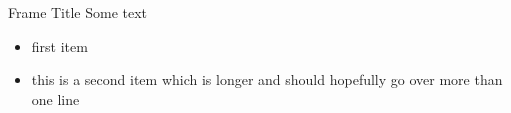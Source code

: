 \documentclass{beamer}
\begin{document}
\begin{frame}{Frame Title}
Some text
\addtolength{\leftmargini}{\labelsep}
\begin{itemize}
    \item first item
    \item this is a second item which is longer and should hopefully go over more than one line
\end{itemize}
\end{frame}
\end{document}
